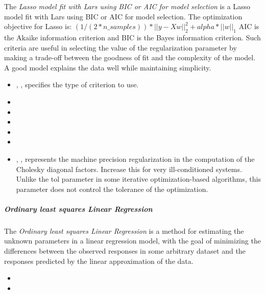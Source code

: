 The \textit{Lasso model fit with Lars using BIC or AIC for model selection} is
a Lasso model fit with Lars using BIC or AIC for model selection.
The optimization objective for Lasso is:
$(1 / (2 * n\_samples)) * ||y - Xw||^2_2 + alpha * ||w||_1$
AIC is the Akaike information criterion and BIC is the Bayes information
criterion.
%
Such criteria are useful in selecting the value of the regularization parameter
by making a trade-off between the goodness of fit and the complexity of the
model.
%
A good model explains the data well while maintaining simplicity.
%
\begin{itemize}
  \item {}, , specifies the type of
  criterion to use.
  \item {}
  \item \verDescriptionB
  \item {}
  \item \precomputeDescription{}
  \item \maxIterDescription{}
  \item {}, , represents the machine
  precision regularization in the computation of the Cholesky diagonal factors.
  Increase this for very ill-conditioned systems.
  Unlike the tol parameter in some iterative optimization-based algorithms, this
  parameter does not control the tolerance of the optimization.
\end{itemize}

\subparagraph{Ordinary least squares Linear Regression}
\mbox{}

The \textit{Ordinary least squares Linear Regression} is a method for
estimating the unknown parameters in a linear regression model, with the goal of
minimizing the differences between the observed responses in some arbitrary
dataset and the responses predicted by the linear approximation of the data.
%

\begin{itemize}
  \item {}
  \item {}
\end{itemize}

